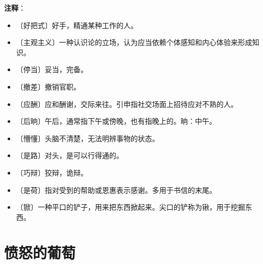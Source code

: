 \documentclass[12pt,UTF-8,openany]{ctexbook}
\begin{document}
\newpage

\textbf{注释}：

\vspace{-1em}

\begin{itemize}
    \setlength\itemsep{-0.2em}
    \item 〔好把式〕好手，精通某种工作的人。
    \item 〔主观主义〕一种认识论的立场，认为应当依赖个体感知和内心体验来形成知识。
    \item 〔停当〕妥当，完备。
    \item 〔撤差〕撤销官职。
    \item 〔应酬〕应和酬谢，交际来往。引申指社交场面上招待应对不熟的人。
    \item 〔后晌〕午后，通常指下午或傍晚，也有指晚上的。晌：中午。
    \item 〔懵懂〕头脑不清楚，无法明辨事物的状态。
    \item 〔是路〕对头，是可以行得通的。
    \item 〔巧辩〕狡辩，诡辩。
    \item 〔是荷〕指对受到的帮助或恩惠表示感谢。多用于书信的末尾。
    \item 〔锨〕一种平口的铲子，用来把东西掀起来。尖口的铲称为锹，用于挖掘东西。
\end{itemize}

\chapter{愤怒的葡萄}
\end{document}

